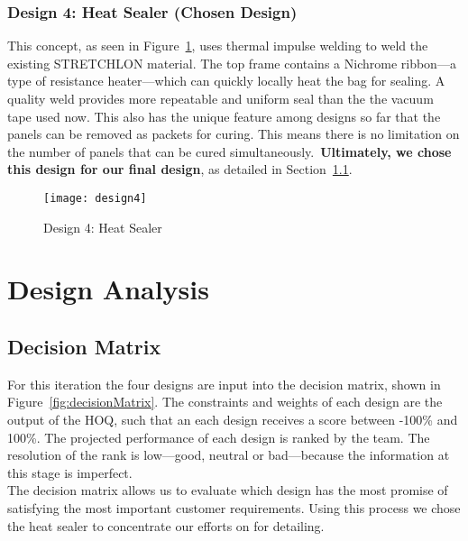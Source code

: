 \documentclass[12pt,letterpaper,notitlepage]{article}
\begin{document}
\subsubsection{Design 4: Heat Sealer (Chosen Design)}
This concept, as seen in Figure~\ref{fig:design4}, uses thermal
impulse welding to weld the existing STRETCHLON material. The top
frame contains a Nichrome ribbon—a type of resistance heater—which can
quickly locally heat the bag for sealing.  A quality weld provides
more repeatable and uniform seal than the the vacuum tape used
now. This also has the unique feature among designs so far that the
panels can be removed as packets for curing. This means there is no
limitation on the number of panels that can be cured
simultaneously.~\textbf{Ultimately, we chose this design for our final
  design}, as detailed in Section~\ref{sec:decisionMatrix}.
\begin{figure}[H]
\centering
\texttt{[image: design4]}
\caption{Design 4: Heat Sealer}
\label{fig:design4}
\end{figure}
\section{Design Analysis}
\subsection{Decision Matrix}
\label{sec:decisionMatrix}
For this iteration the four designs are input into the decision matrix, shown in Figure~\ref{fig:decisionMatrix}. The constraints and weights of each design are the output of the HOQ, such that an each design receives a score between -100\% and 100\%. The projected performance of each design is ranked by the team. The resolution of the rank is low—good, neutral or bad—because the information at this stage is imperfect.\\

The decision matrix allows us to evaluate which design has the most promise of satisfying the most important customer requirements. Using this process we chose the heat sealer to concentrate our efforts on for detailing.\\
\end{document}
